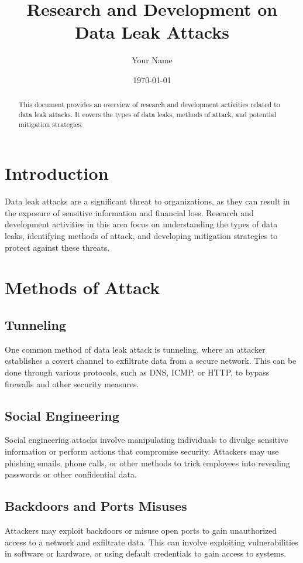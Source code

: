 \documentclass{article}
\title{Research and Development on Data Leak Attacks}
\author{Your Name}
\date{\today}
\begin{document}
\maketitle

\begin{abstract}
This document provides an overview of research and development activities related to data leak attacks. It covers the types of data leaks, methods of attack, and potential mitigation strategies.
\end{abstract}

\section{Introduction}
Data leak attacks are a significant threat to organizations, as they can result in the exposure of sensitive information and financial loss. Research and development activities in this area focus on understanding the types of data leaks, identifying methods of attack, and developing mitigation strategies to protect against these threats.

\section{Methods of Attack}

\subsection{Tunneling}
One common method of data leak attack is tunneling, where an attacker establishes a covert channel to exfiltrate data from a secure network. This can be done through various protocols, such as DNS, ICMP, or HTTP, to bypass firewalls and other security measures.

\subsection{Social Engineering}
Social engineering attacks involve manipulating individuals to divulge sensitive information or perform actions that compromise security. Attackers may use phishing emails, phone calls, or other methods to trick employees into revealing passwords or other confidential data.

\subsection{Backdoors and Ports Misuses}
Attackers may exploit backdoors or misuse open ports to gain unauthorized access to a network and exfiltrate data. This can involve exploiting vulnerabilities in software or hardware, or using default credentials to gain access to systems.
\end{document}
